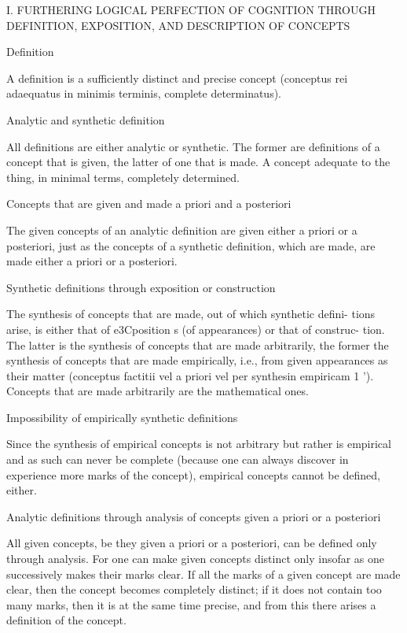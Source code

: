     I. FURTHERING LOGICAL PERFECTION OF COGNITION THROUGH
    DEFINITION, EXPOSITION, AND DESCRIPTION OF CONCEPTS

    Definition

    A definition is a sufficiently distinct and precise concept
    (conceptus rei adaequatus in minimis terminis, complete determinatus).

    Analytic and synthetic definition

    All definitions are either analytic or synthetic. The former are definitions
    of a concept that is given, the latter of one that is made.
    A concept adequate to the thing, in minimal terms, completely determined.

    Concepts that are given and made a priori and a posteriori

    The given concepts of an analytic definition are given either a priori or a
    posteriori, just as the concepts of a synthetic definition, which are made,
    are made either a priori or a posteriori.

    Synthetic definitions through exposition or construction

    The synthesis of concepts that are made, out of which synthetic defini-
    tions arise, is either that of e3Cposition s (of appearances) or that of construc-
    tion. The latter is the synthesis of concepts that are made arbitrarily, the
    former the synthesis of concepts that are made empirically, i.e., from given
    appearances as their matter (conceptus factitii vel a priori vel per synthesin
    empiricam 1 '). Concepts that are made arbitrarily are the mathematical ones.

    Impossibility of empirically synthetic definitions

    Since the synthesis of empirical concepts is not arbitrary but
    rather is empirical and as such can never be complete
    (because one can always discover in experience more marks of the concept),
    empirical concepts cannot be defined, either.

    Analytic definitions through analysis of concepts given a priori or a posteriori

    All given concepts, be they given a priori or a posteriori, can be defined only
    through analysis. For one can make given concepts distinct only insofar as
    one successively makes their marks clear. If all the marks of a given
    concept are made clear, then the concept becomes completely distinct; if it
    does not contain too many marks, then it is at the same time precise, and
    from this there arises a definition of the concept.

